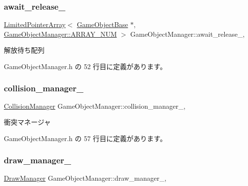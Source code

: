 \subsubsection{\texorpdfstring{await\+\_\+release\+\_\+}{await\_release\_}}
{\footnotesize\ttfamily \mbox{\hyperlink{class_limited_pointer_array}{Limited\+Pointer\+Array}}$<$ \mbox{\hyperlink{class_game_object_base}{Game\+Object\+Base}} $\ast$, \mbox{\hyperlink{class_game_object_manager_a591934d64d750c10c03c908371470681}{Game\+Object\+Manager\+::\+A\+R\+R\+A\+Y\+\_\+\+N\+UM}} $>$ Game\+Object\+Manager\+::await\+\_\+release\+\_\+\hspace{0.3cm}{\ttfamily [static]}, {\ttfamily [private]}}



解放待ち配列 



 Game\+Object\+Manager.\+h の 52 行目に定義があります。

\mbox{\label{class_game_object_manager_a3a173415abbd4acbe2abaf40e0a6c1b8}} 
\subsubsection{\texorpdfstring{collision\+\_\+manager\+\_\+}{collision\_manager\_}}
{\footnotesize\ttfamily \mbox{\hyperlink{class_collision_manager}{Collision\+Manager}} Game\+Object\+Manager\+::collision\+\_\+manager\+\_\+\hspace{0.3cm}{\ttfamily [static]}, {\ttfamily [private]}}



衝突マネージャ 



 Game\+Object\+Manager.\+h の 57 行目に定義があります。

\mbox{\label{class_game_object_manager_afad3b0a750982e55d71edd72b440c724}} 
\subsubsection{\texorpdfstring{draw\+\_\+manager\+\_\+}{draw\_manager\_}}
{\footnotesize\ttfamily \mbox{\hyperlink{class_draw_manager}{Draw\+Manager}} Game\+Object\+Manager\+::draw\+\_\+manager\+\_\+\hspace{0.3cm}{\ttfamily [static]}, {\ttfamily [private]}}



